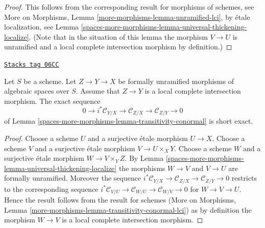\begin{proof}
This follows from the corresponding result for morphisms of schemes, see
More on Morphisms, Lemma \ref{more-morphisms-lemma-unramified-lci},
by \'etale localization, see
Lemma \ref{spaces-more-morphisms-lemma-universal-thickening-localize}.
(Note that in the situation of this lemma the morphism $V \to U$
is unramified and a local complete intersection morphism by definition.)
\end{proof}

\begin{lemma}
\label{spaces-more-morphisms-lemma-transitivity-conormal-lci}
\href{https://stacks.math.columbia.edu/tag/06CC}{\texttt{Stacks tag 06CC}}

Let $S$ be a scheme. Let $Z \to Y \to X$ be formally unramified morphisms
of algebraic spaces over $S$. Assume that $Z \to Y$ is a local complete
intersection morphism. The exact sequence
$$
0 \to i^*\mathcal{C}_{Y/X} \to
\mathcal{C}_{Z/X} \to
\mathcal{C}_{Z/Y} \to 0
$$
of
Lemma \ref{spaces-more-morphisms-lemma-transitivity-conormal}
is short exact.
\end{lemma}

\begin{proof}
Choose a scheme $U$ and a surjective \'etale morphism $U \to X$.
Choose a scheme $V$ and a surjective \'etale morphism $V \to U \times_X Y$.
Choose a scheme $W$ and a surjective \'etale morphism $W \to V \times_Y Z$.
By
Lemma \ref{spaces-more-morphisms-lemma-universal-thickening-localize}
the morphisms $W \to V$ and $V \to U$ are formally unramified.
Moreover the sequence
$i^*\mathcal{C}_{Y/X} \to \mathcal{C}_{Z/X} \to \mathcal{C}_{Z/Y} \to 0$
restricts to the corresponding sequence
$i^*\mathcal{C}_{V/U} \to \mathcal{C}_{W/U} \to \mathcal{C}_{W/V} \to 0$
for $W \to V \to U$. Hence the result follows from the result for schemes
(More on Morphisms, Lemma \ref{more-morphisms-lemma-transitivity-conormal-lci})
as by definition the morphism $W \to V$ is a local complete intersection
morphism.
\end{proof}


